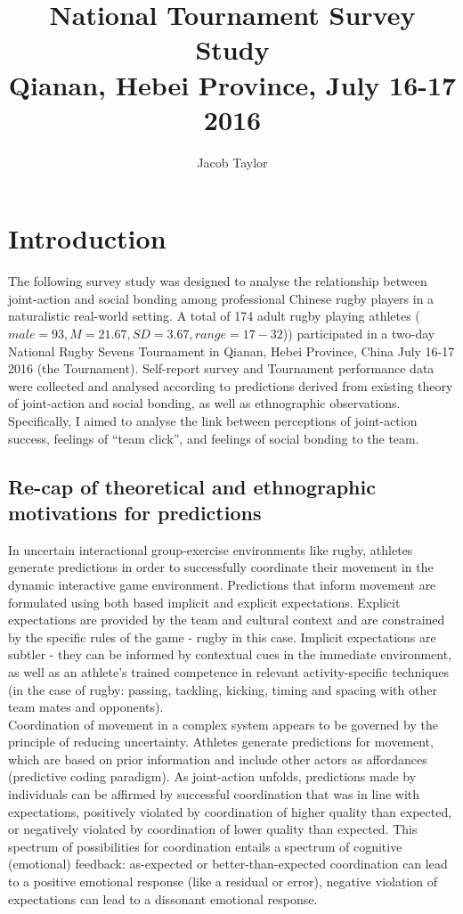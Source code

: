 \documentclass[12pt]{report}
\title{
{National Tournament Survey Study}\\
{Qianan, Hebei Province, July 16-17 2016}
}
\author{Jacob Taylor}
\begin{document}
\maketitle{}


\tableofcontents
\clearpage

\section{Introduction}
The following survey study was designed to analyse the relationship between joint-action and social bonding among professional Chinese rugby players in a naturalistic real-world setting. A total of 174 adult rugby playing athletes  ($male = 93, M = 21.67, SD = 3.67, range = 17-32$)) participated in a two-day National Rugby Sevens Tournament in Qianan, Hebei Province, China July 16-17 2016 (the Tournament). Self-report survey and Tournament performance data were collected and analysed according to predictions derived from existing theory of joint-action and social bonding, as well as ethnographic observations. Specifically, I aimed to analyse the link between perceptions of joint-action success, feelings of ``team click'', and feelings of social bonding to the team.

\subsection{Re-cap of theoretical and ethnographic motivations for predictions}
In uncertain interactional group-exercise environments like rugby, athletes generate predictions in order to successfully coordinate their movement in the dynamic interactive game environment. Predictions that inform movement are formulated using both based implicit and explicit expectations. Explicit expectations are provided by the team and cultural context and are constrained by the specific rules of the game - rugby in this case. Implicit expectations are subtler - they can be informed by contextual cues in the immediate environment, as well as an athlete’s trained competence in relevant activity-specific techniques (in the case of rugby: passing, tackling, kicking, timing and spacing with other team mates and opponents). \\

Coordination of movement in a complex system appears to be governed by the principle of reducing uncertainty. Athletes generate predictions for movement, which are based on prior information and include other actors as affordances (predictive coding paradigm). As joint-action unfolds, predictions made by individuals can be affirmed by successful coordination that was in line with expectations, positively violated by coordination of higher quality than expected, or negatively violated by coordination of lower quality than expected. This spectrum of possibilities for coordination entails a spectrum of cognitive (emotional) feedback: as-expected or better-than-expected coordination can lead to a positive emotional response (like a residual or error), negative violation of expectations can lead to a dissonant emotional response. \\
\end{document}
